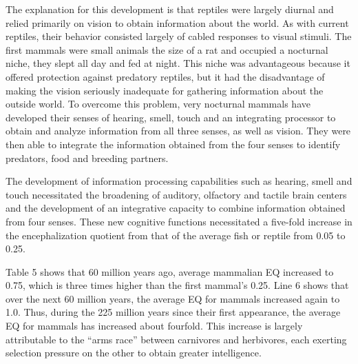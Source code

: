 The explanation for this development is that reptiles were largely diurnal and relied primarily on
vision to obtain information about the world. 
As with current reptiles, their behavior consisted largely of cabled responses to visual stimuli.
The first mammals were small animals the size of a rat and occupied a nocturnal niche, they slept
all day and fed at night.
This niche was advantageous because it offered protection against predatory reptiles, but it had
the disadvantage of making the vision seriously inadequate for gathering information about the
outside world.
To overcome this problem, very nocturnal mammals have developed their senses of hearing, smell, 
touch and an integrating processor to obtain and analyze information from all three senses, as
well as vision.
They were then able to integrate the information obtained from the four senses to identify
predators, food and breeding partners.

The development of information processing capabilities such as hearing, smell and touch
necessitated the broadening of auditory, olfactory and tactile brain centers and the development 
of an integrative capacity to combine information obtained from four senses.
These new cognitive functions necessitated a five-fold increase in the encephalization quotient
from that of the average fish or reptile from 0.05 to 0.25.

Table 5 shows that 60 million years ago, average mammalian EQ increased to 0.75, which is three 
times higher than the first mammal’s 0.25. Line 6 shows that over the next 60 million years,
the average EQ for mammals increased again to 1.0.
Thus, during the 225 million years since their first appearance, the average EQ for mammals has 
increased about fourfold.
This increase is largely attributable to the ``arms race'' between carnivores and herbivores,
each exerting selection pressure on the other to obtain greater intelligence.

